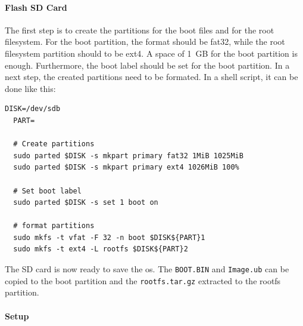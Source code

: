 \paragraph{Flash SD Card}
The first step is to create the partitions for the boot files and for the root filesystem.
For the boot partition, the format should be fat32, while the root filesystem partition should to be ext4.
A space of \SI{1}{GB} for the boot partition is enough.
Furthermore, the boot label should be set for the boot partition.
In a next step, the created partitions need to be formated.
In a shell script, it can be done like this:

\begin{lstlisting}[style=bash, caption={Prepair SD card}, label=lst:create_partitions]
  DISK=/dev/sdb
  PART=

  # Create partitions
  sudo parted $DISK -s mkpart primary fat32 1MiB 1025MiB
  sudo parted $DISK -s mkpart primary ext4 1026MiB 100%

  # Set boot label
  sudo parted $DISK -s set 1 boot on

  # format partitions
  sudo mkfs -t vfat -F 32 -n boot $DISK${PART}1
  sudo mkfs -t ext4 -L rootfs $DISK${PART}2
\end{lstlisting}

The SD card is now ready to save the \acrshort{os}.
The \texttt{BOOT.BIN} and \texttt{Image.ub} can be copied to the boot partition and the \texttt{rootfs.tar.gz} extracted to the rootfs partition.

\paragraph{Setup}
